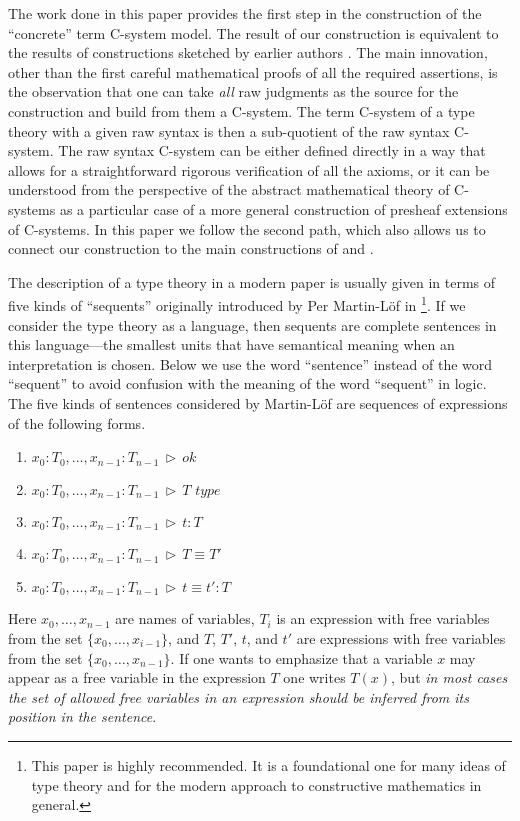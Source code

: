 \documentclass[onecolumn,12pt]{amsart}
\numberwithin{proposition}{subsection}
\DeclareMathOperator{\rh}{\,\rhd\,}
\newcommand{\type}{\,\,type}
\begin{document}
The work done in this paper provides the first step in the construction of the
``concrete'' term C-system model. The result of our construction is equivalent
to the results of constructions sketched by earlier authors \cite{Hofmann}. The
main innovation, other than the first careful mathematical proofs of all the
required assertions, is the observation that one can take {\em all} raw
judgments as the source for the construction and build from them a
C-system. The term C-system of a type theory with a given raw syntax is then a
sub-quotient of the raw syntax C-system. The raw syntax C-system can be either
defined directly in a way that allows for a straightforward rigorous
verification of all the axioms, or it can be understood from the
perspective of the abstract mathematical theory of C-systems as a particular
case of a more general construction of presheaf extensions of C-systems. In
this paper we follow the second path, which also allows us to connect our
construction to the main constructions of \cite{LandJf} and \cite{LandC}.

The description of a type theory in a modern paper is usually given in terms of
five kinds of ``sequents'' originally introduced by Per Martin-L\"{o}f in
\cite[p.~161]{MLTT79}\footnote{This paper is highly recommended. It is a
  foundational one for many ideas of type theory and for the modern approach to
  constructive mathematics in general.}.  If we consider the type theory as a
language, then sequents are complete sentences in this language---the smallest
units that have semantical meaning when an interpretation is chosen. Below we
use the word ``sentence'' instead of the word ``sequent'' to avoid confusion
with the meaning of the word ``sequent'' in logic. The five kinds of sentences
considered by Martin-L\"{o}f are sequences of expressions of the following
forms.
%
%
\begin{enumerate}[label={(\bfseries S\arabic*)}]
\item \label{2017.02.06.eq1} \quad \quad $x_0:T_0,\dots,x_{n-1}:T_{n-1}\rh ok$\\
\item \label{2017.02.06.eq2} \quad \quad $x_0:T_0,\dots,x_{n-1}:T_{n-1}\rh T\type$\\
\item \label{2017.02.06.eq3} \quad \quad $x_0:T_0,\dots,x_{n-1}:T_{n-1}\rh t:T$\\
\item \label{2017.02.06.eq4} \quad \quad $x_0:T_0,\dots,x_{n-1}:T_{n-1}\rh T\equiv T'$\\
\item \label{2017.02.06.eq5} \quad \quad $x_0:T_0,\dots,x_{n-1}:T_{n-1}\rh t\equiv t':T$
\end{enumerate}
%
Here $x_0,\dots,x_{n-1}$ are names of variables, $T_i$ is an expression with
free variables from the set $\{x_0,\dots,x_{i-1}\}$, and $T$, $T'$, $t$, and $t'$ are
expressions with free variables from the set $\{x_0,\dots,x_{n-1}\}$. If one
wants to emphasize that a variable $x$ may appear as a free variable in the
expression $T$ one writes $T(x)$, but {\em in most cases the set of allowed
  free variables in an expression should be inferred from its position in the
  sentence}.
\end{document}
